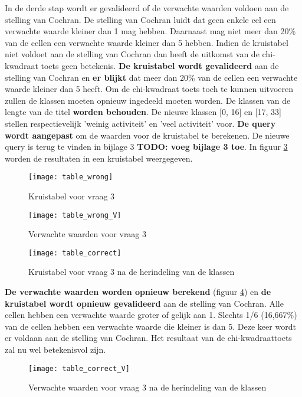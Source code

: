 In de derde stap wordt er gevalideerd of de verwachte waarden voldoen aan de stelling van Cochran. De stelling van Cochran luidt dat geen enkele cel een verwachte waarde kleiner dan 1 mag hebben. Daarnaast mag niet meer dan 20\% van de cellen een verwachte waarde kleiner dan 5 hebben. Indien de kruistabel niet voldoet aan de stelling van Cochran dan heeft de uitkomst van de chi-kwadraat toets geen betekenis. \textbf{De kruistabel wordt gevalideerd} aan de stelling van Cochran en \textbf{er blijkt} dat meer dan 20\% van de cellen een verwachte waarde kleiner dan 5 heeft. Om de chi-kwadraat toets toch te kunnen uitvoeren zullen de klassen moeten opnieuw ingedeeld moeten worden. De klassen van de lengte van de titel \textbf{worden behouden}. De nieuwe klassen [0, 16] en [17, 33] stellen respectievelijk 'weinig activiteit' en 'veel activiteit' voor. \textbf{De query wordt aangepast} om de waarden voor de kruistabel te berekenen. De nieuwe query is terug te vinden in bijlage 3 \textbf{TODO: voeg bijlage 3 toe}. In figuur \ref{fig:tablecorrect} worden de resultaten in een kruistabel weergegeven.


\begin{figure}
	\centering
	\texttt{[image: table\_wrong]}
	\caption{Kruistabel voor vraag 3}
	\label{fig:tablewrong}
\end{figure}

\begin{figure}
	\centering
	\texttt{[image: table\_wrong\_V]}
	\caption{Verwachte waarden voor vraag 3}
	\label{fig:tablewrongV}
\end{figure}

\begin{figure}
	\centering
	\texttt{[image: table\_correct]}
	\caption{Kruistabel voor vraag 3 na de herindeling van de klassen}
	\label{fig:tablecorrect}
\end{figure}

\textbf{De verwachte waarden worden opnieuw berekend } (figuur \ref{fig:tablecorrectV}) en \textbf{de kruistabel wordt opnieuw gevalideerd} aan de stelling van Cochran. Alle cellen hebben een verwachte waarde groter of gelijk aan 1. Slechts 1/6 (16,667\%) van de cellen hebben een verwachte waarde die kleiner is dan 5. Deze keer wordt er voldaan aan de stelling van Cochran. Het resultaat van de chi-kwadraattoets zal nu wel betekenisvol zijn.


\begin{figure}
	\centering
	\texttt{[image: table\_correct\_V]}
	\caption{Verwachte waarden voor vraag 3 na de herindeling van de klassen}
	\label{fig:tablecorrectV}
\end{figure}


